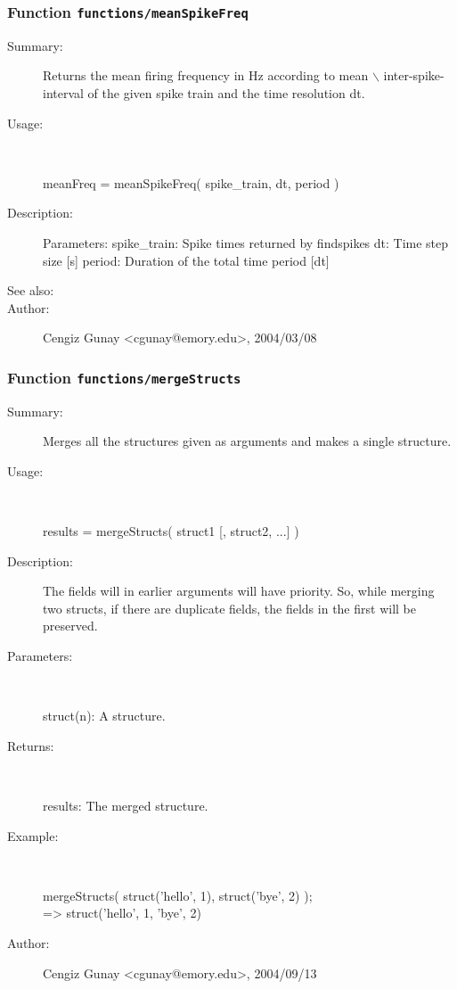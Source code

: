 \subsubsection[Function \texttt{meanSpikeFreq}]{Function \texttt{functions/meanSpikeFreq}}%
%
\label{ref_functions__meanSpikeFreq}%
\hypertarget{ref_functions__meanSpikeFreq}{}%
\begin{description}
\item[Summary:]Returns the mean firing frequency in Hz according to mean $\backslash$
  	    inter-spike-interval of the given spike train and the 
	    time resolution dt.
%
\item[Usage:]~%
\begin{lyxcode}%
meanFreq = meanSpikeFreq( spike\_train, dt, period )
%
\end{lyxcode}%
%
\item[Description:]%
Parameters:
		spike\_train: Spike times returned by findspikes
		dt: Time step size [s]
		period: Duration of the total time period [dt]
%
%
%
\item[See also:]%
%
\item[Author:]%
Cengiz Gunay <cgunay@emory.edu>, 2004/03/08
%
\end{description}
\methodline%
\subsubsection[Function \texttt{mergeStructs}]{Function \texttt{functions/mergeStructs}}%
%
\label{ref_functions__mergeStructs}%
\hypertarget{ref_functions__mergeStructs}{}%
\begin{description}
\item[Summary:]Merges all the structures given as arguments and makes a single structure.
%
\item[Usage:]~%
\begin{lyxcode}%
results = mergeStructs( struct1 [, struct2, ...] )
%
\end{lyxcode}%
%
\item[Description:]%
The fields will in earlier arguments will have priority. So, while merging two
 structs, if there are duplicate fields, the fields in the first will be preserved.
\item[Parameters:]~

struct(n): A structure.
%
\item[Returns:
]~

 	results: The merged structure.
%
\item[Example:]~
\begin{lyxcode} mergeStructs( struct('hello', 1), struct('bye', 2) );
\\%
  => struct('hello', 1, 'bye', 2)
\\%
\end{lyxcode}
%
%
\item[Author:]%
Cengiz Gunay <cgunay@emory.edu>, 2004/09/13
%
\end{description}
\methodline%
